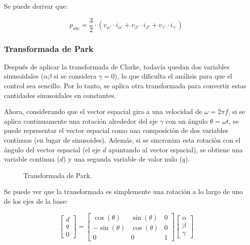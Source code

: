 Se puede derivar que:

\begin{equation}
p_{abc} = \frac{3}{2} \cdot (v_{\alpha'} \cdot i_{\alpha'} + v_{\beta'} \cdot i_{\beta'} + v_{\gamma'} \cdot i_{\gamma'})
\end{equation}


\subsubsection{Transformada de Park}

Después de aplicar la transformada de Clarke, todavía quedan dos variables sinusoidales (\(\alpha\beta\) si se considera \(\gamma = 0\)), lo que dificulta el análisis para que el control sea sencillo. Por lo tanto, se aplica otra transformada para convertir estas cantidades sinusoidales en constantes.

Ahora, considerando que el vector espacial gira a una velocidad de \(\omega = 2\pi f\), si se aplica continuamente una rotación alrededor del eje \(\gamma\) con un ángulo \(\theta = \omega  t\), se puede representar el vector espacial como una composición de dos variables continuas (en lugar de sinusoides). Además, si se sincroniza esta rotación con el ángulo del vector espacial (el eje \(d\) apuntando al vector espacial), se obtiene una variable continua (\(d\)) y una segunda variable de valor nulo (\(q\)).

\begin{figure}[H]
  \centering
  \caption{Transformada de Park.}
\end{figure}

Se puede ver que la transformada es simplemente una rotación a lo largo de uno de los ejes de la base:

\begin{equation}
    \begin{bmatrix}
        d \\
        q \\
        0
    \end{bmatrix}
    =
    \begin{bmatrix}
        \cos(\theta) & \sin(\theta) & 0 \\
        -\sin(\theta) & \cos(\theta) & 0 \\
        0 & 0 & 1
    \end{bmatrix}
    \begin{bmatrix}
        \alpha \\
        \beta \\
        \gamma
    \end{bmatrix}
\end{equation}

